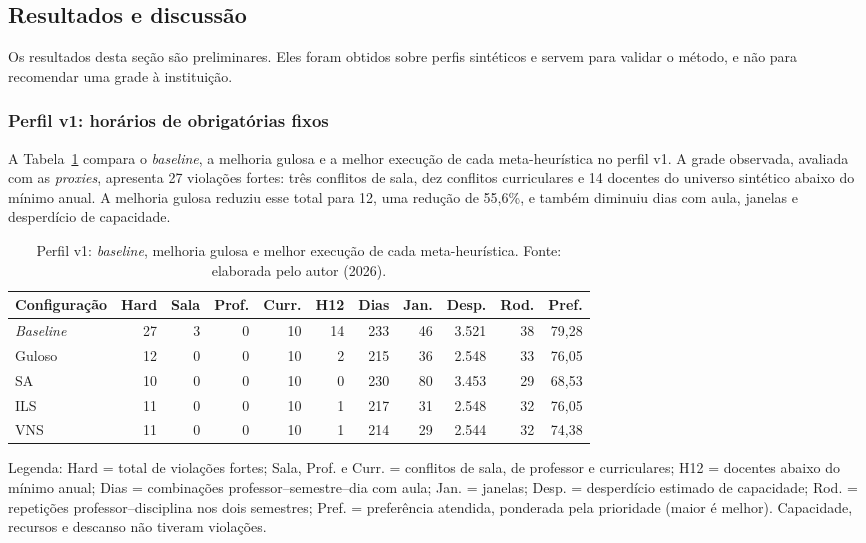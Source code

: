 \subsection{Resultados e discussão}
\label{subsec:resultados}

Os resultados desta seção são preliminares. Eles foram obtidos sobre perfis sintéticos e servem para validar o método, e não para recomendar uma grade à instituição. 

\subsubsection{Perfil v1: horários de obrigatórias fixos}

A Tabela~\ref{tab:resultado_v1} compara o \textit{baseline}, a melhoria gulosa e a melhor execução de cada meta-heurística no perfil v1. A grade observada, avaliada com as \textit{proxies}, apresenta 27 violações fortes: três conflitos de sala, dez conflitos curriculares e 14 docentes do universo sintético abaixo do mínimo anual. A melhoria gulosa reduziu esse total para 12, uma redução de 55,6\%, e também diminuiu dias com aula, janelas e desperdício de capacidade.

\begin{table}[htbp]
  \centering
  \caption{Perfil v1: \textit{baseline}, melhoria gulosa e melhor execução de cada meta-heurística. Fonte: elaborada pelo autor (2026).}
  \label{tab:resultado_v1}
  \small
  \setlength{\tabcolsep}{4pt}
  \begin{tabular}{lrrrrrrrrrr}
    \toprule
    \textbf{Configuração} & \textbf{Hard} & \textbf{Sala} & \textbf{Prof.} & \textbf{Curr.} & \textbf{H12} & \textbf{Dias} & \textbf{Jan.} & \textbf{Desp.} & \textbf{Rod.} & \textbf{Pref.} \\
    \midrule
    \textit{Baseline} & 27 & 3 & 0 & 10 & 14 & 233 & 46 & 3.521 & 38 & 79,28 \\
    Guloso            & 12 & 0 & 0 & 10 &  2 & 215 & 36 & 2.548 & 33 & 76,05 \\
    SA                & 10 & 0 & 0 & 10 &  0 & 230 & 80 & 3.453 & 29 & 68,53 \\
    ILS               & 11 & 0 & 0 & 10 &  1 & 217 & 31 & 2.548 & 32 & 76,05 \\
    VNS               & 11 & 0 & 0 & 10 &  1 & 214 & 29 & 2.544 & 32 & 74,38 \\
    \bottomrule
  \end{tabular}

  \vspace{0.2cm}
  \parbox{0.95\textwidth}{\footnotesize Legenda: Hard = total de violações fortes; Sala, Prof. e Curr. = conflitos de sala, de professor e curriculares; H12 = docentes abaixo do mínimo anual; Dias = combinações professor--semestre--dia com aula; Jan. = janelas; Desp. = desperdício estimado de capacidade; Rod. = repetições professor--disciplina nos dois semestres; Pref. = preferência atendida, ponderada pela prioridade (maior é melhor). Capacidade, recursos e descanso não tiveram violações.}
\end{table}

